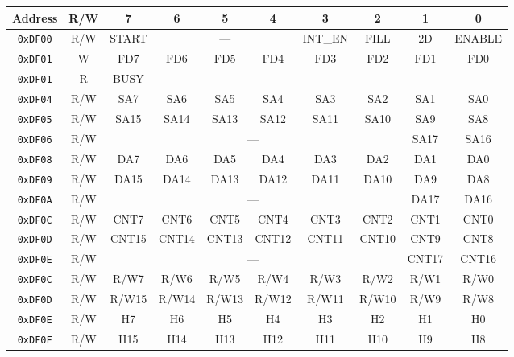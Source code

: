 \begin{table}[ht]
    \begin{center}
        \begin{tabular}{|c|c|c|c|c|c|c|c|c|c|} \hline
            Address & R/W & 7 & 6 & 5 & 4 & 3 & 2 & 1 & 0 \\\hline\hline
            \verb+0xDF00+ & R/W & START & \multicolumn{3}{|c|}{---} & INT\_EN & FILL & 2D & ENABLE \\ \hline
            \verb+0xDF01+ & W & FD7 & FD6 & FD5 & FD4 & FD3 & FD2 & FD1 & FD0 \\ \hline
            \verb+0xDF01+ & R & BUSY & \multicolumn{7}{|c|}{---}  \\ \hline\hline

            \verb+0xDF04+ & R/W & SA7 & SA6 & SA5 & SA4 & SA3 & SA2 & SA1 & SA0 \\ \hline
            \verb+0xDF05+ & R/W & SA15 & SA14 & SA13 & SA12 & SA11 & SA10 & SA9 & SA8 \\ \hline
            \verb+0xDF06+ & R/W & \multicolumn{6}{|c|}{---} & SA17 & SA16 \\ \hline\hline

            \verb+0xDF08+ & R/W & DA7 & DA6 & DA5 & DA4 & DA3 & DA2 & DA1 & DA0 \\ \hline
            \verb+0xDF09+ & R/W & DA15 & DA14 & DA13 & DA12 & DA11 & DA10 & DA9 & DA8 \\ \hline
            \verb+0xDF0A+ & R/W & \multicolumn{6}{|c|}{---} & DA17 & DA16 \\ \hline\hline

            \verb+0xDF0C+ & R/W & CNT7 & CNT6 & CNT5 & CNT4 & CNT3 & CNT2 & CNT1 & CNT0 \\ \hline
            \verb+0xDF0D+ & R/W & CNT15 & CNT14 & CNT13 & CNT12 & CNT11 & CNT10 & CNT9 & CNT8 \\ \hline
            \verb+0xDF0E+ & R/W & \multicolumn{6}{|c|}{---} & CNT17 & CNT16 \\ \hline\hline

            \verb+0xDF0C+ & R/W & R/W7 & R/W6 & R/W5 & R/W4 & R/W3 & R/W2 & R/W1 & R/W0 \\ \hline
            \verb+0xDF0D+ & R/W & R/W15 & R/W14 & R/W13 & R/W12 & R/W11 & R/W10 & R/W9 & R/W8 \\ \hline
            \verb+0xDF0E+ & R/W & H7 & H6 & H5 & H4 & H3 & H2 & H1 & H0 \\ \hline
            \verb+0xDF0F+ & R/W & H15 & H14 & H13 & H12 & H11 & H10 & H9 & H8 \\ \hline\hline


\end{tabular}
\end{center}
\end{table}
